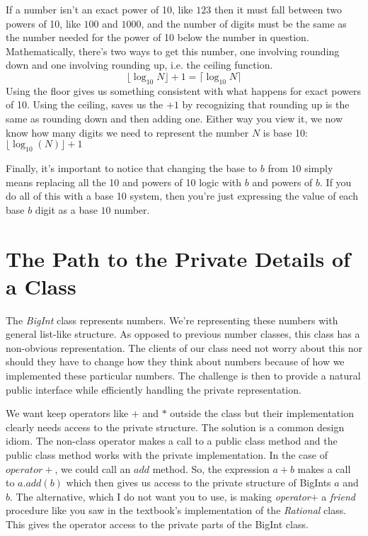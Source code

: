 \documentclass[10pt]{article}
\begin{document}
If a number isn't an exact power of 10, like $123$ then it must fall between two powers of 10, like $100$ and $1000$, and the number of digits must be the same as the number needed for the power of 10 below the number in question. Mathematically, there's two ways to get this number, one involving rounding down and one involving rounding up, i.e. the ceiling function. 
\[
\lfloor \log_{10} N \rfloor + 1  = \lceil \log_{10} N \rceil
\]
Using the floor gives us something consistent with what happens for exact powers of 10. Using the ceiling, saves us the $+1$ by recognizing that rounding up is the same as rounding down and then adding one. Either way you view it, we now know how many digits we need to represent the number $N$ is base 10: $\lfloor\log_{10}(N)\rfloor + 1$

Finally, it's important to notice that changing the base to $b$ from $10$ simply means replacing all the 10 and powers of 10 logic with $b$ and powers of $b$. If you do all of this with a base 10 system, then you're just expressing the value of each base $b$ digit as a base $10$ number. 

\section{The Path to the Private Details of a Class}

The \textit{BigInt} class represents numbers. We're representing these numbers with general list-like structure. As opposed to previous number classes, this class has a non-obvious representation. The clients of our class need not worry about this nor should they have to change how they think about numbers because of how we implemented these particular numbers. The challenge is then to provide a natural public interface while efficiently handling the private representation. 

We want keep operators like $+$ and $*$ outside the class but their implementation clearly needs access to the private structure. The solution is a common design idiom. The non-class operator makes a call to a public class method and the public class method works with the private implementation. In the case of $operator+$, we could call an $add$ method. So, the expression $a + b$ makes a call to $a.add(b)$ which then gives us access to the private structure of BigInts $a$ and $b$. The alternative, which I do not want you to use, is making \textit{operator$+$} a \textit{friend} procedure like you saw in the textbook's implementation of the \textit{Rational} class. This gives the operator access to the private parts of the BigInt class. 
\end{document}
